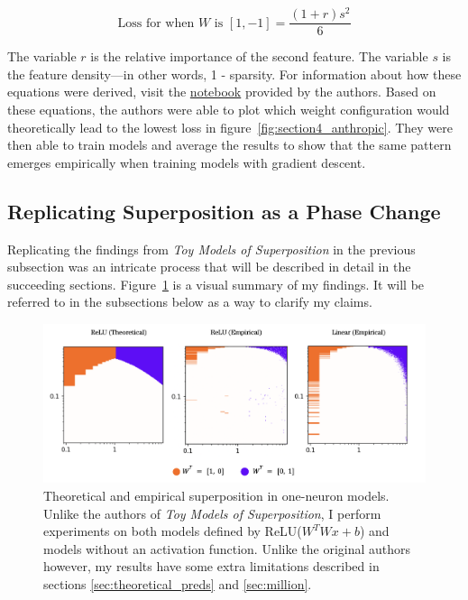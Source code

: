 \documentclass{article} %
\begin{document}
\begin{equation}
    \label{eq:loss3}
    \text{Loss for when  $W$ is $[1, -1]$} = \frac{(1 + r)s^2}{6}
\end{equation}

The variable $r$ is the relative importance of the second feature. The variable
$s$ is the feature density---in other words, 1 - sparsity. For information
about how these equations were derived, visit the
\href{https://github.com/wattenberg/superposition/blob/main/Exploring_Exact_Toy_Models.ipynb}{notebook} 
provided by the authors.
Based on these equations, the authors were able to plot which weight configuration
would theoretically lead to the lowest loss in figure~\ref{fig:section4_anthropic}.
They were then able to train models and average the results to show that the
same pattern emerges empirically when training models with gradient descent.

\subsection{Replicating Superposition as a Phase Change}

Replicating the findings from \textit{Toy Models of Superposition} in the
previous subsection was an intricate process that will be described in detail in the
succeeding sections. Figure~\ref{fig:phase_changes_replication} is a visual
summary of my findings. It will be referred to in the subsections below as a
way to clarify my claims.

\begin{figure}[h]
    \centering
    \includegraphics[width=0.99\linewidth]{phase_changes/images/phase_changes_replication.png}
    \captionsetup{font=footnotesize, width=0.7\linewidth} %
    \caption{
        Theoretical and empirical superposition in one-neuron models. Unlike
        the authors of \textit{Toy Models of Superposition}, I perform experiments
        on both models defined by ReLU($W^TWx + b$) and models without an activation
        function. Unlike the original authors however, my results have some extra
        limitations described in sections \ref{sec:theoretical_preds} and \ref{sec:million}.
    }
    \label{fig:phase_changes_replication}
\end{figure}
\end{document}
